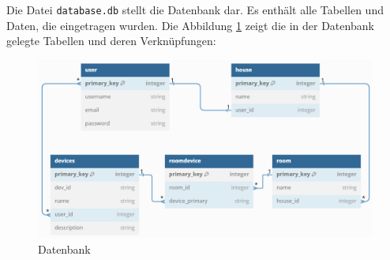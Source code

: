 \documentclass[12pt, letterpaper]{article}
\begin{document}
  \par Die Datei \texttt{database.db} stellt die Datenbank dar. Es enthält alle Tabellen und Daten, die eingetragen wurden. Die Abbildung \ref{abb:datenbank} zeigt die in der Datenbank gelegte Tabellen und deren Verknüpfungen:
  \begin{figure}[h]
    \centering
    \includegraphics[width=\textwidth]{datenbank.png}
    \caption{Datenbank}
    \label{abb:datenbank}
  \end{figure}
\end{document}
